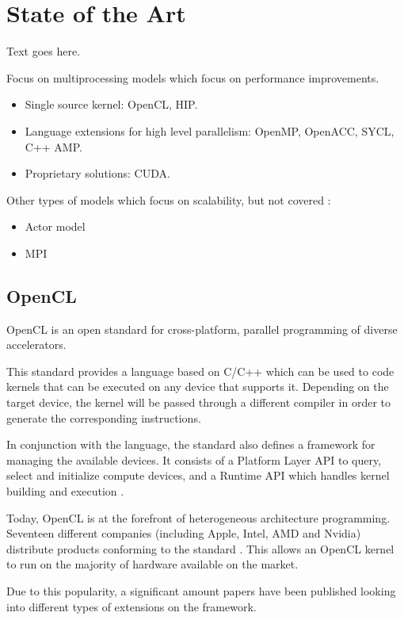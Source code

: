 \chapter{State of the Art}

Text goes here.

Focus on multiprocessing models which focus on performance improvements.

\begin{itemize}
    \item Single source kernel: OpenCL, HIP.
    \item Language extensions for high level parallelism: OpenMP, OpenACC, SYCL, C++ AMP.
    \item Proprietary solutions: CUDA.
\end{itemize}

Other types of models which focus on scalability, but not covered \cite{survey_programming_models}:

\begin{itemize}
    \item Actor model
    \item MPI
\end{itemize}


\section{OpenCL}
OpenCL is an open standard for cross-platform, parallel programming of diverse accelerators. 

This standard provides a language based on C/C++ which can be used to code kernels that can be executed on any device that supports it. Depending on the target device, the kernel will be passed through a different compiler in order to generate the corresponding instructions. 

In conjunction with the language, the standard also defines a framework for managing the available devices. It consists of a Platform Layer API to query, select and initialize compute devices, and a Runtime API which handles kernel building and execution \cite{opencl_overview}. 

Today, OpenCL is at the forefront of heterogeneous architecture programming. Seventeen different companies (including Apple, Intel, AMD and Nvidia) distribute products conforming to the standard \cite{opencl_conformant_companies}. This allows an OpenCL kernel to run on the majority of hardware available on the market.

Due to this popularity, a significant amount papers have been published looking into different types of extensions on the framework.

